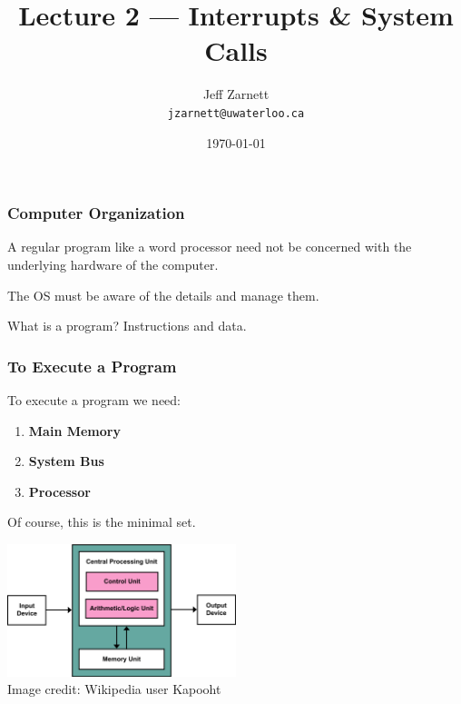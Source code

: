 

\title{Lecture 2 --- Interrupts \& System Calls }

\author{Jeff Zarnett \\ \small \texttt{jzarnett@uwaterloo.ca}}
\date{\today}




\begin{frame}
  \titlepage

 \end{frame}

\begin{frame}
\frametitle{Computer Organization}

A regular program like a word processor need not be concerned with the underlying hardware of the computer.

The OS must be aware of the details and manage them.

What is a program? Instructions and data.


\end{frame}

\begin{frame}
\frametitle{To Execute a Program}

To execute a program we need:

\begin{enumerate}
	\item \textbf{Main Memory}
	\item \textbf{System Bus}
	\item \textbf{Processor}
\end{enumerate}

Of course, this is the minimal set.

\begin{center}
\includegraphics[width=0.5\textwidth]{images/von-neumann}\\
Image credit: Wikipedia user Kapooht
\end{center}



\end{frame}


